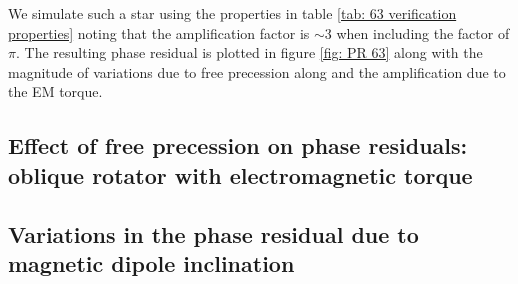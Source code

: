 \documentclass[/home/greg/Thesis/main/main.tex]{subfiles}
\begin{document}
We simulate such a star using the properties in table \ref{tab: 63 verification
properties} noting that the amplification factor is $\sim 3$ when including the
factor of $\pi$. The resulting phase residual is plotted in figure \ref{fig: PR
63} along with the magnitude of variations due to free precession along and the
amplification due to the EM torque.

%    
%

\begin{figure}[htb]
\begin{floatrow}
\capbtabbox{%
  
}{%
  \caption{}%
  \label{tab: 63 verification properties}
}
\end{floatrow}
\end{figure}


\subsection{Effect of free precession on phase residuals: oblique rotator with
electromagnetic torque}

\subsection{Variations in the phase residual due to magnetic dipole inclination}

\end{document}

